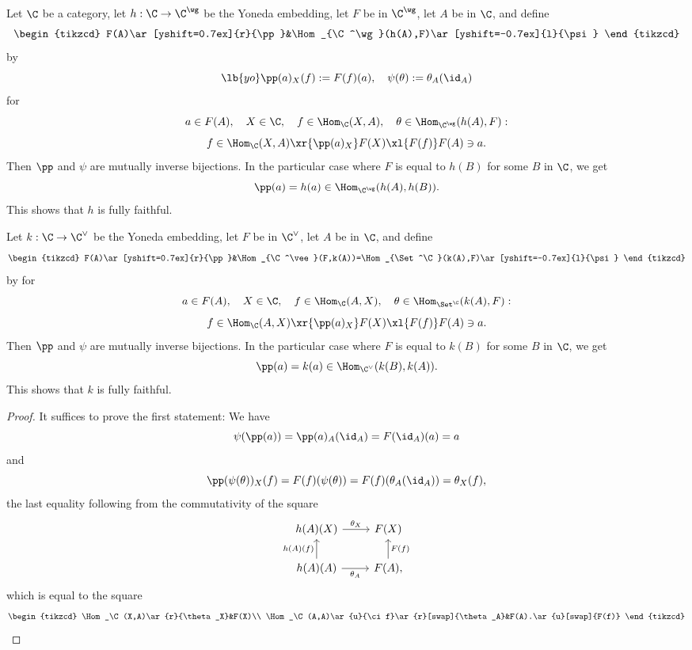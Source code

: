 \documentclass[12pt]{article}
\theoremstyle{remark}
\theoremstyle{definition}
\begin{document}
\begin{thm}
Let $\C$ be a category, let $h:\C\to\C^\wg$ be the Yoneda embedding, let $F$ be in $\C^\wg$, let $A$ be in $\C$, and define 
$$
\begin{tikzcd} 
F(A)\ar[yshift=0.7ex]{r}{\pp}&\Hom_{\C^\wg}(h(A),F)\ar[yshift=-0.7ex]{l}{\psi}
\end{tikzcd}
$$
by 
\begin{equation}\lb{yo}
\pp(a)_X(f):=F(f)(a),\quad\psi(\theta):=\theta_A(\id_A)
\end{equation}
for 
$$
a\in F(A),\quad X\in\C,\quad f\in\Hom_\C(X,A),\quad\theta\in\Hom_{\C^\wg}(h(A),F):
$$ 
$$
f\in\Hom_\C(X,A)\xr{\pp(a)_X}F(X)\xl{F(f)}F(A)\ni a.
$$
Then $\pp$ and $\psi$ are mutually inverse bijections. In the particular case where $F$ is equal to $h(B)$ for some $B$ in $\C$, we get 
$$
\pp(a)=h(a)\in\Hom_{\C^\wg}(h(A),h(B)).
$$
This shows that $h$ is fully faithful.

Let $k:\C\to\C^\vee$ be the Yoneda embedding, let $F$ be in $\C^\vee$, let $A$ be in $\C$, and define 
$$
\begin{tikzcd} 
F(A)\ar[yshift=0.7ex]{r}{\pp}&\Hom_{\C^\vee}(F,k(A))=\Hom_{\Set^\C}(k(A),F)\ar[yshift=-0.7ex]{l}{\psi}
\end{tikzcd}
$$
by  for 
$$
a\in F(A),\quad X\in\C,\quad f\in\Hom_\C(A,X),\quad\theta\in\Hom_{\Set^\C}(k(A),F):
$$ 
$$
f\in\Hom_\C(A,X)\xr{\pp(a)_X}F(X)\xl{F(f)}F(A)\ni a.
$$
Then $\pp$ and $\psi$ are mutually inverse bijections. In the particular case where $F$ is equal to $k(B)$ for some $B$ in $\C$, we get 
$$
\pp(a)=k(a)\in\Hom_{\C^\vee}(k(B),k(A)).
$$
This shows that $k$ is fully faithful.
\end{thm}
%
\begin{proof}
It suffices to prove the first statement: We have 
$$
\psi(\pp(a))=\pp(a)_A(\id_A)=F(\id_A)(a)=a
$$ 
and
$$
\pp(\psi(\theta))_X(f)=F(f)(\psi(\theta))=F(f)(\theta_A(\id_A))=\theta_X(f),
$$ 
the last equality following from the commutativity of the square 
$$
\begin{tikzcd}
h(A)(X)\ar{r}{\theta_X}&F(X)\\ 
h(A)(A)\ar{u}{h(A)(f)}\ar{r}[swap]{\theta_A}&F(A),\ar{u}[swap]{F(f)}
\end{tikzcd}
$$ 
which is equal to the square 
$$
\begin{tikzcd}
\Hom_\C(X,A)\ar{r}{\theta_X}&F(X)\\ 
\Hom_\C(A,A)\ar{u}{\ci f}\ar{r}[swap]{\theta_A}&F(A).\ar{u}[swap]{F(f)}
\end{tikzcd}
$$
\end{proof}
\end{document}
